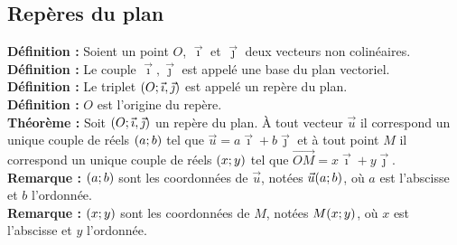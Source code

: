 \documentclass[a4paper,titlepage]{article}
\let\oldleft\left
\renewcommand{\left}{\mathopen{}\mathclose\bgroup\oldleft}
\let\oldright\right
\renewcommand{\right}{\aftergroup\egroup\oldright}
\begin{document}
    \subsection{Repères du plan}
        \textbf{Définition :} Soient un point $O$, $\vec{\imath}$ et $\vec{\jmath}$ deux vecteurs non colinéaires.
        \\
        \textbf{Définition :} Le couple $\vec{\imath},\vec{\jmath}$ est appelé une base du plan vectoriel.
        \\
        \textbf{Définition :} Le triplet $\left(O;\vec{\imath},\vec{\jmath}\right)$ est appelé un repère du plan.
        \\
        \textbf{Définition :} $O$ est l’origine du repère.
        \\
        \textbf{Théorème :} Soit $\left(O;\vec{\imath},\vec{\jmath}\right)$ un repère du plan. À tout vecteur $\vec{u}$ il correspond un unique couple de réels $\left(a;b\right)$ tel que $\vec{u}=a\vec{\imath}+b\vec{\jmath}$ et à tout point $M$ il correspond un unique couple de réels $\left(x;y\right)$ tel que $\overrightarrow{OM}=x\vec{\imath}+y\vec{\jmath}$.
        \\
        \textbf{Remarque :} $\left(a;b\right)$ sont les coordonnées de $\vec{u}$, notées $\vec{u}\left(a;b\right)$, où $a$ est l’abscisse et $b$ l’ordonnée.
        \\
        \textbf{Remarque :} $\left(x;y\right)$ sont les coordonnées de $M$, notées $M\left(x;y\right)$, où $x$ est l’abscisse et $y$ l’ordonnée.
\end{document}
